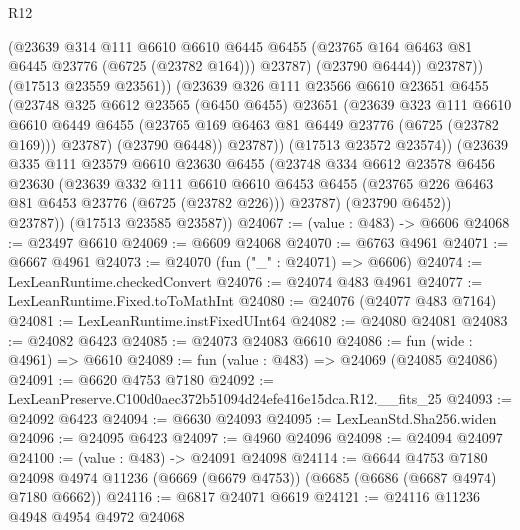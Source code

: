 \begin{lexlean}{R12}
\begin{coremodule}
                    (@23639
                      @314
                      @111
                      @6610
                      @6610
                      @6445
                      @6455
                      (@23765 @164 @6463 @81 @6445 @23776 (@6725 (@23782 @164)))
                      @23787)
                    (@23790 @6444))
                  @23787))
              (@17513 @23559 @23561))
            (@23639
              @326
              @111
              @23566
              @6610
              @23651
              @6455
              (@23748
                @325
                @6612
                @23565
                (@6450 @6455)
                @23651
                (@23639
                  @323
                  @111
                  @6610
                  @6610
                  @6449
                  @6455
                  (@23765 @169 @6463 @81 @6449 @23776 (@6725 (@23782 @169)))
                  @23787)
                (@23790 @6448))
              @23787))
          (@17513 @23572 @23574))
        (@23639
          @335
          @111
          @23579
          @6610
          @23630
          @6455
          (@23748
            @334
            @6612
            @23578
            @6456
            @23630
            (@23639
              @332
              @111
              @6610
              @6610
              @6453
              @6455
              (@23765 @226 @6463 @81 @6453 @23776 (@6725 (@23782 @226)))
              @23787)
            (@23790 @6452))
          @23787))
      (@17513 @23585 @23587))
@24067 := (value : @483) -> @6606
@24068 := @23497 @6610
@24069 := @6609 @24068
@24070 := @6763 @4961
@24071 := @6667 @4961
@24073 := @24070 (fun ("_" : @24071) => @6606)
@24074 := LexLeanRuntime.checkedConvert
@24076 := @24074 @483 @4961
@24077 := LexLeanRuntime.Fixed.toToMathInt
@24080 := @24076 (@24077 @483 @7164)
@24081 := LexLeanRuntime.instFixedUInt64
@24082 := @24080 @24081
@24083 := @24082 @6423
@24085 := @24073 @24083 @6610
@24086 := fun (wide : @4961) => @6610
@24089 := fun (value : @483) => @24069 (@24085 @24086)
@24091 := @6620 @4753 @7180
@24092 := LexLeanPreserve.C100d0aec372b51094d24efe416e15dca.R12.__fits_25
@24093 := @24092 @6423
@24094 := @6630 @24093
@24095 := LexLeanStd.Sha256.widen
@24096 := @24095 @6423
@24097 := @4960 @24096
@24098 := @24094 @24097
@24100 := (value : @483) -> @24091 @24098
@24114 := @6644
    @4753
    @7180
    @24098
    @4974
    @11236
    (@6669 (@6679 @4753))
    (@6685 (@6686 (@6687 @4974) @7180 @6662))
@24116 := @6817 @24071 @6619
@24121 := @24116 @11236 @4948 @4954 @4972 @24068

\end{coremodule}
\end{lexlean}
